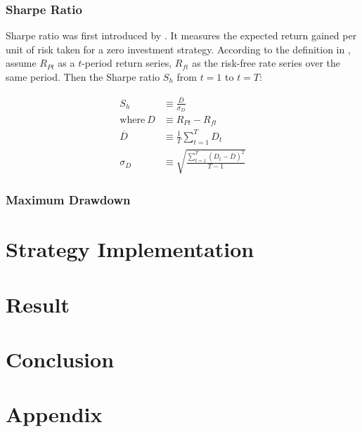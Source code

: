 \documentclass[12pt]{article}
\begin{document}
\subsubsection{Sharpe Ratio}

Sharpe ratio was first introduced by \cite{sharpe1966}. It measures the expected return gained per unit of risk taken for a zero investment strategy. According to the definition in \cite{sharpe1994}, assume \(R_{Pt}\) as a \(t\)-period return series, \(R_{ft}\) as the risk-free rate series over the same period. Then the Sharpe ratio \(S_h\) from \(t=1\) to \(t=T\):

\begin{align}
  S_h &\equiv \frac{\overline{D}}{\sigma_D} \\
  \text{where}~D &\equiv R_{Pt} - R_{ft} \\
  \overline{D} &\equiv \frac{1}{T} \sum_{t=1}^T D_t \\
  \sigma_D &\equiv \sqrt{\frac{\sum_{t=1}^T (D_t-\overline{D})^2}{T-1}}
\end{align}

\subsubsection{Maximum Drawdown}

\section{Strategy Implementation}

\section{Result}

\section{Conclusion}

\section{Appendix}

\renewcommand{\refname}{Reference} %
\printbibliography
\end{document}
